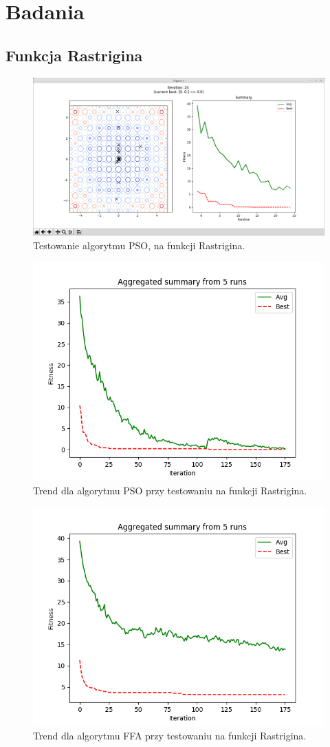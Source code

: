 \pagebreak
\section{Badania}

\subsection{Funkcja Rastrigina}

\begin{figure}[H]
	\centering
	\includegraphics[width=0.7\linewidth]{imgs/program_rastrigin}
	\caption{Testowanie algorytmu PSO, na funkcji Rastrigina.}
	\label{fig:program_rastrigin}
\end{figure}

\begin{figure}[H]
	\centering
	\includegraphics[width=0.7\linewidth]{analysis/rastrigin/pso_rastrigin/pso_rastrigin}
	\caption{Trend dla algorytmu PSO przy testowaniu na funkcji Rastrigina.}
	\label{fig:pso_rastrigin}
\end{figure}

\begin{figure}[H]
	\centering
	\includegraphics[width=0.7\linewidth]{analysis/rastrigin/ffa_rastrigin/ffa_rastrigin}
	\caption{Trend dla algorytmu FFA przy testowaniu na funkcji Rastrigina.}
	\label{fig:ffa_rastrigin}
\end{figure}

